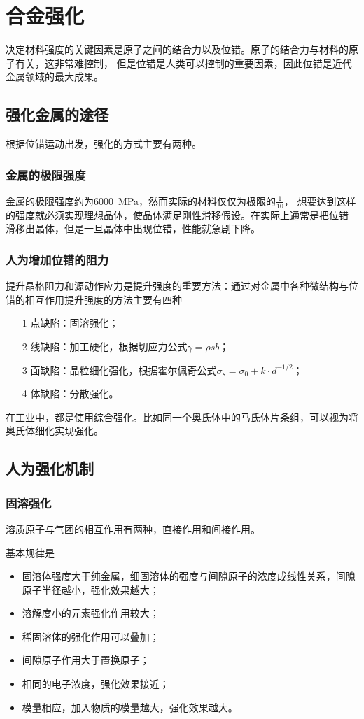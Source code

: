\chapter{合金强化}
    决定材料强度的关键因素是原子之间的结合力以及位错。原子的结合力与材料的原子有关，这非常难控制，
    但是位错是人类可以控制的重要因素，因此位错是近代金属领域的最大成果。

    \section{强化金属的途径}
        根据位错运动出发，强化的方式主要有两种。
        \subsection{金属的极限强度}
            金属的极限强度约为\SI{6000}{\MPa}，然而实际的材料仅仅为极限的$\frac{1}{10}$，
            想要达到这样的强度就必须实现理想晶体，使晶体满足刚性滑移假设。在实际上通常是把位错
            滑移出晶体，但是一旦晶体中出现位错，性能就急剧下降。
        \subsection{人为增加位错的阻力}
            提升晶格阻力和源动作应力是提升强度的重要方法：通过对金属中各种微结构与位错的相互作用提升强度的方法主要有四种
            \begin{enumerate}
                \item[1] 点缺陷：固溶强化；
                \item[2] 线缺陷：加工硬化，根据切应力公式$\gamma=\rho sb$；
                \item[3] 面缺陷：晶粒细化强化，根据霍尔佩奇公式$\sigma_s=\sigma_0+k\cdot d^{-1/2}$；
                \item[4] 体缺陷：分散强化。
            \end{enumerate}
            在工业中，都是使用综合强化。比如同一个奥氏体中的马氏体片条组，可以视为将奥氏体细化实现强化。
    \section{人为强化机制}
        \subsection{固溶强化}
            溶质原子与气团的相互作用有两种，直接作用和间接作用。

            基本规律是
            \begin{itemize}
                \item 固溶体强度大于纯金属，细固溶体的强度与间隙原子的浓度成线性关系，间隙原子半径越小，强化效果越大；
                \item 溶解度小的元素强化作用较大；
                \item 稀固溶体的强化作用可以叠加；
                \item 间隙原子作用大于置换原子；
                \item 相同的电子浓度，强化效果接近；
                \item 模量相应，加入物质的模量越大，强化效果越大。
            \end{itemize}
